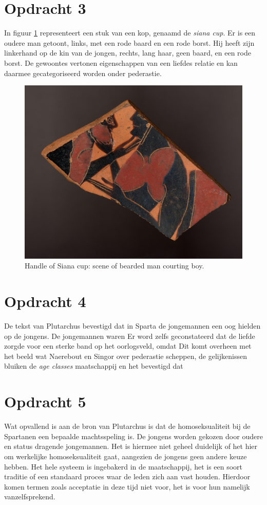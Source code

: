 \documentclass[11pt]{amsart}
\begin{document}
\section*{Opdracht 3}
\noindent In figuur \ref{fig:siana-cup} \autocite{SianaCup575BC} representeert een stuk van een kop, genaamd de \textit{siana
     cup}. Er is een oudere man getoont, links, met een rode baard en een rode borst. Hij heeft zijn linkerhand op de kin
van de jongen, rechts, lang haar, geen baard, en een rode borst. De gewoontes vertonen eigenschappen van een liefdes
relatie en kan daarmee gecategoriseerd worden onder pederastie.
\begin{figure}[H]
     \includegraphics[width=0.5\linewidth]{images/452769001.jpg}
     \caption{Handle of Siana cup: scene of bearded man courting boy.}
     \label{fig:siana-cup}
\end{figure}

\section*{Opdracht 4}
\noindent De tekst van Plutarchus bevestigd dat in Sparta de jongemannen een oog hielden op de jongens. De jongemannen waren
\autocite{plutarchusLevenVanPelopidas120} Er word zelfs geconstateerd dat de liefde zorgde voor een sterke
band op het oorlogsveld, omdat \autocite{plutarchusLevenVanPelopidas120} Dit komt overheen met het beeld wat Naerebout en Singor over
pederastie scheppen, de gelijkenissen bluiken de \textit{age classes} maatschappij en het bevestigd dat \autocite{naereboutOudheidGriekenRomeinen2022}

\section*{Opdracht 5}\label{opdracht5}
\noindent Wat opvallend is aan de bron van Plutarchus \autocite{plutarchusLevenVanPelopidas120} is dat de homoseksualiteit bij de
Spartanen een bepaalde machtsspeling is. De jongens worden gekozen door oudere en status dragende jongemannen. Het is
hiermee niet geheel duidelijk of het hier om werkelijke homoseksualiteit gaat, aangezien de jongens geen andere keuze
hebben. Het hele systeem is ingebakerd in de maatschappij, het is een soort traditie of een standaard proces waar de
leden zich aan vast houden. Hierdoor komen termen zoals acceptatie in deze tijd niet voor, het is voor hun namelijk
vanzelfsprekend.
\end{document}
